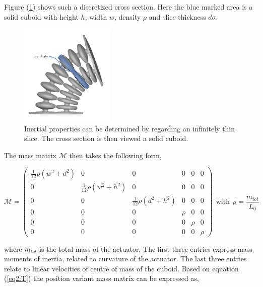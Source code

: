 Figure (\ref{fig:massapprox}) shows such a discretized cross section. Here the blue marked area is a solid cuboid with height $h$, width $w$, density $\rho$ and slice thickness $d\sigma$. 


\begin{figure}[H]
    \centering
    \includegraphics[width = 0.4\textwidth]{Figures/Chapter2/massapprox.png}
    \caption{Inertial properties can be determined by regarding an infinitely thin slice. The cross section is then viewed a solid cuboid.}
    \label{fig:massapprox}
\end{figure}

The mass matrix $\mathcal{M}$ then takes the following form,

\begin{equation}
    \mathcal{M} = \begin{pmatrix} \frac{1}{12}\rho (w^2 + d^2) & 0 & 0 & 0 & 0 & 0 \\
                                  0 & \frac{1}{12}\rho (w^2 + h^2) & 0 & 0 & 0 & 0 \\
                                  0 & 0 & \frac{1}{12}\rho (d^2 + h^2) & 0 & 0 & 0 \\
                                  0 & 0 & 0 & \rho & 0 & 0 \\
                                  0 & 0 & 0 & 0 & \rho & 0 \\
                                  0 & 0 & 0 & 0 & 0 & \rho \end{pmatrix}\hspace{5pt} \text{with} \hspace{5pt} \rho = \frac{m_{tot}}{L_0}
\end{equation} 




where $m_{tot}$ is the total mass of the actuator. The first three entries express mass moments of inertia, related to curvature of the actuator. The last three entries relate to linear velocities of centre of mass of the cuboid. Based on equation (\ref{eq2:T}) the position variant mass matrix can be expressed as, 



